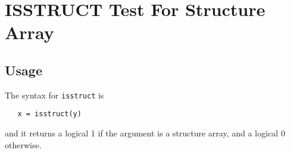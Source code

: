\section{ISSTRUCT Test For Structure Array}

\subsection{Usage}

The syntax for \verb|isstruct| is
\begin{verbatim}
   x = isstruct(y)
\end{verbatim}
and it returns a logical 1 if the argument is a structure
array, and a logical 0 otherwise.
